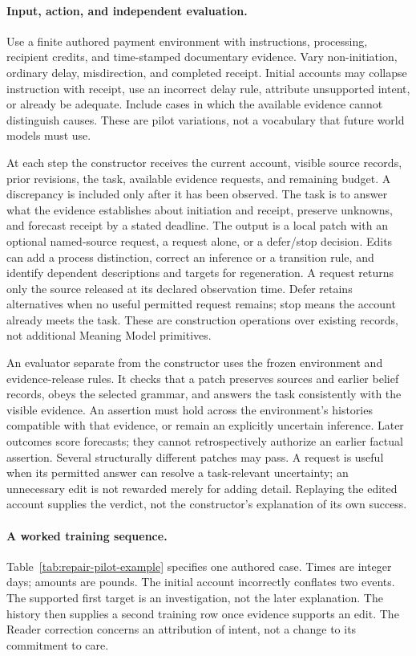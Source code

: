 \documentclass[10pt]{article}
\begin{document}
\paragraph{Input, action, and independent evaluation.}
Use a finite authored payment environment with instructions, processing,
recipient credits, and time-stamped documentary evidence. Vary non-initiation,
ordinary delay, misdirection, and completed receipt. Initial accounts may
collapse instruction with receipt, use an incorrect delay rule, attribute
unsupported intent, or already be adequate. Include cases in which the
available evidence cannot distinguish causes. These are pilot variations,
not a vocabulary that future world models must use.

At each step the constructor receives the current account, visible source
records, prior revisions, the task, available evidence requests, and remaining
budget. A discrepancy is included only after it has been observed. The task is
to answer what the evidence establishes about initiation and receipt, preserve
unknowns, and forecast receipt by a stated deadline. The output is a local
patch with an optional named-source request, a request alone, or a defer/stop
decision. Edits can
add a process distinction, correct an inference or a transition rule, and
identify dependent descriptions and targets for regeneration. A request
returns only the source released at its declared observation time. Defer
retains alternatives when no useful permitted request remains; stop means the
account already meets the task. These are construction operations over existing
records, not additional Meaning Model primitives.

An evaluator separate from the constructor uses the frozen environment and
evidence-release rules. It checks that a patch preserves sources and earlier
belief records, obeys the selected grammar, and answers the task consistently
with the visible evidence. An assertion must hold across the environment's
histories compatible with that evidence, or remain an explicitly uncertain
inference. Later outcomes score forecasts; they cannot retrospectively
authorize an earlier factual assertion. Several structurally different patches
may pass. A request is useful when its permitted answer can resolve a
task-relevant uncertainty; an unnecessary edit is not rewarded merely for
adding detail. Replaying the edited account supplies the verdict, not the
constructor's explanation of its own success.

\paragraph{A worked training sequence.}
Table~\ref{tab:repair-pilot-example} specifies one authored case. Times are
integer days; amounts are pounds. The initial account incorrectly conflates
two events. The supported first target is an investigation, not the later
explanation. The history then supplies a second training row once evidence
supports an edit. The Reader correction concerns an attribution of intent,
not a change to its commitment to care.
\end{document}
